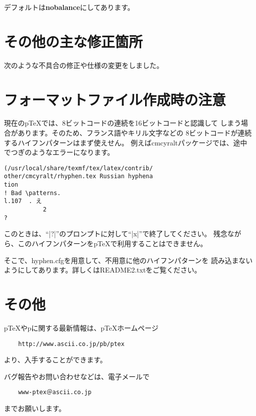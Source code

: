 \documentclass{plnews}
\begin{document}
デフォルトは\textbf{nobalance}にしてあります。


\section{その他の主な修正箇所}
次のような不具合の修正や仕様の変更をしました。



\section{フォーマットファイル作成時の注意}
現在のp\TeX{}では、8ビットコードの連続を16ビットコードと認識して
しまう場合があります。そのため、フランス語やキリル文字などの
8ビットコードが連続するハイフンパターンはまず使えせん。
例えばcmcyraltパッケージでは、途中でつぎのようなエラーになります。

\begin{verbatim}
(/usr/local/share/texmf/tex/latex/contrib/
other/cmcyralt/rhyphen.tex Russian hyphena
tion
! Bad \patterns.
l.107  . え
           2
?
\end{verbatim}

このときは、``|?|''のプロンプトに対して``|x|''で終了してください。
残念ながら、このハイフンパターンをp\TeX{}で利用することはできません。

そこで、hyphen.cfgを用意して、不用意に他のハイフンパターンを
読み込まないようにしてあります。詳しくはREADME2.txtをご覧ください。

\section{その他}
p\TeX{}やp\LaTeXe{}に関する最新情報は、p\TeX{}ホームページ
\begin{verbatim}
    http://www.ascii.co.jp/pb/ptex
\end{verbatim}
より、入手することができます。

バグ報告やお問い合わせなどは、電子メールで
\begin{verbatim}
    www-ptex＠ascii.co.jp
\end{verbatim}
までお願いします。
\end{document}
